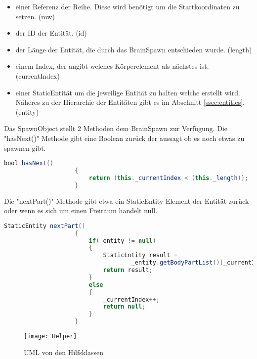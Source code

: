 \documentclass[a4paper,10pt]{report}
\begin{document}
{{{				\begin{itemize}
					\item einer Referenz der Reihe. Diese wird benötigt um die Startkoordinaten zu setzen. (row)
					\item der ID der Entität. (id)
					\item der Länge der Entität, die durch das BrainSpawn entschieden wurde. (length)
					\item einem Index, der angibt welches Körperelement als nächstes ist.\\ (currentIndex)
					\item einer StaticEntität um die jeweilige Entität zu halten welche erstellt wird. Näheres zu der Hierarchie der Entitäten gibt es im Abschnitt \ref{ssec:entities}. (entity)				
				\end{itemize}								
				
				\noindent				
				Das SpawnObject stellt 2 Methoden dem BrainSpawn zur Verfügung.
				\newline \newline \noindent
				Die "hasNext()" Methode gibt eine Boolean zurück der aussagt ob es noch etwas zu spawnen gibt.				
				
				\begin{lstlisting}[language=Java, caption=SpawnObject - hasNext Method]
					bool hasNext()
					{
						return (this._currentIndex < (this._length));
					}
				\end{lstlisting}	
						
				\newpage \noindent
				Die "nextPart()" Methode gibt etwa ein StaticEntity Element der Entität zurück oder wenn es sich um einen Freiraum handelt null.
				
				\begin{lstlisting}[language=Java, caption=SpawnObject - nextPart Method]
					StaticEntity nextPart()
					{
						if(_entity != null)
						{
							StaticEntity result = 
									_entity.getBodyPartList()[_currentIndex++];
							return result;
						}
						else
    					{
      						_currentIndex++;
      						return null;
    					}
					}
				\end{lstlisting}							
			}			
			
		}		
		
		\begin{figure}[h]			
			\texttt{[image: Helper]}
			\caption{UML von den Hilfsklassen}
			\label{fig:umlhelper}
		\end{figure} 	
    	
    }
\end{document}
